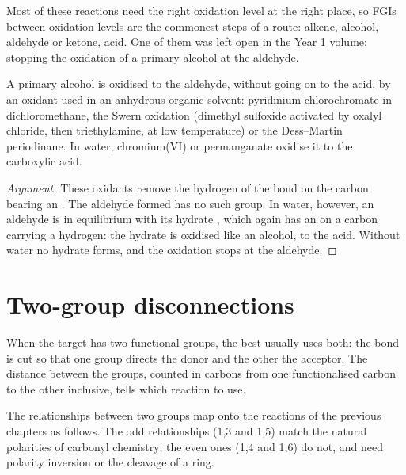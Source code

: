 Most of these reactions need the right oxidation level at the right place, so FGIs between oxidation
levels are the commonest steps of a route: alkene, alcohol, aldehyde or ketone, acid. One of them was
left open in the Year 1 volume: stopping the oxidation of a primary alcohol at the aldehyde.

\begin{proposition}\label{prop:b2:retrosynthesis:mild-oxidation}
A primary alcohol is oxidised to the aldehyde, without going on to the acid, by an oxidant used in an
anhydrous organic solvent: pyridinium chlorochromate in dichloromethane, the Swern oxidation (dimethyl
sulfoxide activated by oxalyl chloride, then triethylamine, at low temperature) or the Dess--Martin
periodinane. In water, chromium(VI) or permanganate oxidise it to the carboxylic acid.
\end{proposition}

\begin{proof}[Argument]
These oxidants remove the hydrogen of the  bond on the carbon bearing an . The aldehyde
formed has no such group. In water, however, an aldehyde is in equilibrium with its hydrate
, which again has an  on a carbon carrying a hydrogen: the hydrate is oxidised
like an alcohol, to the acid. Without water no hydrate forms, and the oxidation stops at the
aldehyde.
\end{proof}

\section{Two-group disconnections}

When the target has two functional groups, the best  usually uses both: the bond is cut
so that one group directs the donor and the other the acceptor. The distance between the groups,
counted in carbons from one functionalised carbon to the other inclusive, tells which reaction to use.

\begin{proposition}\label{prop:b2:retrosynthesis:patterns}
The relationships between two groups map onto the reactions of the previous chapters as follows. The
odd relationships (1,3 and 1,5) match the natural polarities of carbonyl chemistry; the even ones (1,4
and 1,6) do not, and need polarity inversion or the cleavage of a ring.
\end{proposition}


